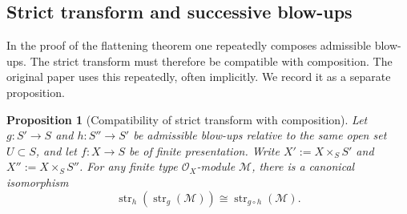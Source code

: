 \documentclass[11pt,oneside]{article}
\newtheorem{proposition}[theorem]{Proposition}
\newcommand{\M}{\mathcal M}
\newcommand{\OO}{\mathcal O}
\newcommand{\st}{\operatorname{str}}
\begin{document}
\subsection{Strict transform and successive blow-ups}

In the proof of the flattening theorem one repeatedly composes admissible blow-ups.  The strict transform must therefore be compatible with composition.  The original paper uses this repeatedly, often implicitly.  We record it as a separate proposition.

\begin{proposition}[Compatibility of strict transform with composition]\label{prop:strict-composition}
Let $g\colon S'\to S$ and $h\colon S''\to S'$ be admissible blow-ups relative to the same open set $U\subset S$, and let $f\colon X\to S$ be of finite presentation.  Write $X':=X\times_S S'$ and $X'':=X\times_S S''$.  For any finite type $\OO_X$-module $\M$, there is a canonical isomorphism
\[
\st_h(\st_g(\M))\cong \st_{g\circ h}(\M).
\]
\end{proposition}
\end{document}
